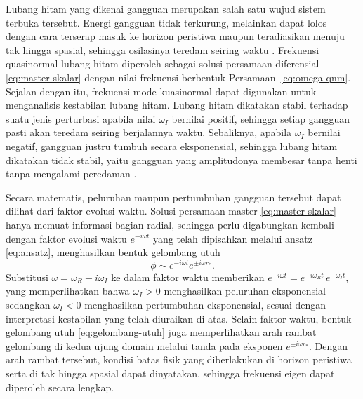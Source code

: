 Lubang hitam yang dikenai gangguan merupakan salah satu wujud sistem terbuka tersebut.
Energi gangguan tidak terkurung, melainkan dapat lolos dengan cara terserap masuk ke horizon
peristiwa maupun teradiasikan menuju tak hingga spasial, sehingga osilasinya teredam seiring
waktu \parencite{Regge1957, Vishveshwara1970}. Frekuensi quasinormal lubang hitam diperoleh
sebagai solusi persamaan diferensial \eqref{eq:master-skalar} dengan nilai frekuensi
berbentuk Persamaan~\eqref{eq:omega-qnm}. Sejalan dengan itu, frekuensi mode kuasinormal
dapat digunakan untuk menganalisis kestabilan lubang hitam. Lubang hitam dikatakan stabil
terhadap suatu jenis perturbasi apabila nilai $\omega_I$ bernilai positif, sehingga setiap
gangguan pasti akan teredam seiring berjalannya waktu. Sebaliknya, apabila $\omega_I$ bernilai
negatif, gangguan justru tumbuh secara eksponensial, sehingga lubang hitam dikatakan tidak
stabil, yaitu gangguan yang amplitudonya membesar tanpa henti tanpa mengalami peredaman
\parencite{Konoplya2011}.

Secara matematis, peluruhan maupun pertumbuhan gangguan tersebut dapat dilihat dari faktor
evolusi waktu. Solusi persamaan master \eqref{eq:master-skalar} hanya memuat informasi bagian
radial, sehingga perlu digabungkan kembali dengan faktor evolusi waktu $e^{-i\omega t}$ yang
telah dipisahkan melalui ansatz \eqref{eq:ansatz}, menghasilkan bentuk gelombang utuh
\begin{equation}
    \phi \sim e^{-i\omega t}e^{\pm i\omega r_*}.
    \label{eq:gelombang-utuh}
\end{equation}
Substitusi $\omega = \omega_R - i\omega_I$ ke dalam faktor waktu memberikan
$e^{-i\omega t} = e^{-i\omega_R t}\, e^{-\omega_I t}$, yang memperlihatkan bahwa
$\omega_I > 0$ menghasilkan peluruhan eksponensial sedangkan $\omega_I < 0$ menghasilkan
pertumbuhan eksponensial, sesuai dengan interpretasi kestabilan yang telah diuraikan di atas.
Selain faktor waktu, bentuk gelombang utuh \eqref{eq:gelombang-utuh} juga memperlihatkan arah
rambat gelombang di kedua ujung domain melalui tanda pada eksponen $e^{\pm i\omega r_*}$. Dengan
arah rambat tersebut, kondisi batas fisik yang diberlakukan di horizon peristiwa serta di tak
hingga spasial dapat dinyatakan, sehingga frekuensi eigen dapat diperoleh secara lengkap.

